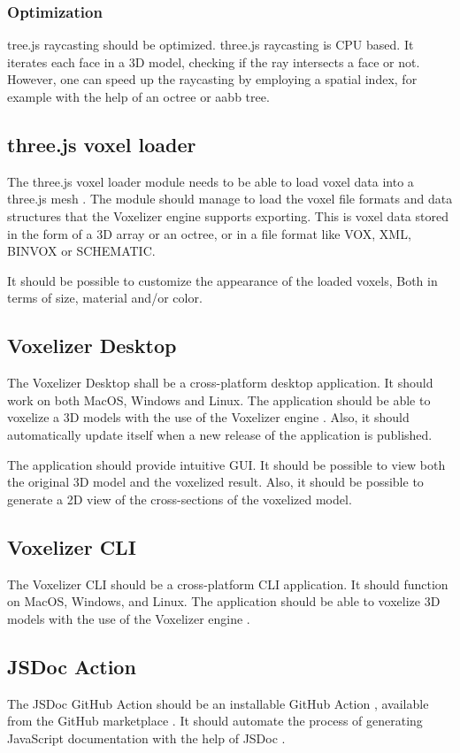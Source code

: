 \subsubsection{Optimization}
tree.js raycasting should be optimized. three.js raycasting is CPU based. It iterates each face in a 3D model, checking if the ray intersects a face or not. However, one can speed up the raycasting by employing a spatial index, for example with the help of an octree \cite{octree} or aabb tree.

\subsection{three.js voxel loader}
The three.js voxel loader module needs to be able to load voxel data into a three.js mesh \cite{three.js-mesh}. The module should manage to load the voxel file formats and data structures that the Voxelizer engine supports exporting. This is voxel data stored in the form of a 3D array or an octree, or in a file format like VOX, XML, BINVOX or SCHEMATIC.

It should be possible to customize the appearance of the loaded voxels, Both in terms of size, material and/or color.

\subsection{Voxelizer Desktop}
The Voxelizer Desktop shall be a cross-platform \cite{cross-platform} desktop application. It should work on both MacOS, Windows and Linux. The application should be able to voxelize a 3D models with the use of the Voxelizer engine \cite{voxelizer}. Also, it should automatically update itself when a new release of the application is published.

The application should provide intuitive GUI. It should be possible to view both the original 3D model and the voxelized result. Also, it should be possible to generate a 2D view of the cross-sections of the voxelized model.

\subsection{Voxelizer CLI}
The Voxelizer CLI should be a cross-platform \cite{cross-platform} CLI application. It should function on MacOS, Windows, and Linux. The application should be able to voxelize 3D models with the use of the Voxelizer engine \cite{voxelizer}.

\subsection{JSDoc Action}
The JSDoc GitHub Action should be an installable GitHub Action \cite{github-actions}, available from the GitHub marketplace \cite{github-marketplace}. It should automate the process of generating JavaScript documentation with the help of JSDoc \cite{jsdoc}.

